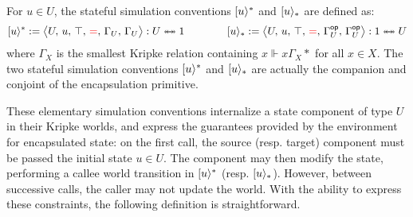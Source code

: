 

\begin{definition}
  For $u \in U$,
  the stateful simulation conventions
  $[ {u} \rangle^*$ and
  $[ {u} \rangle_*$ are defined as:
  \[
    [ {u} \rangle^* :=
    \big\langle U,\, u,\, \top ,\, \textcolor{red}{=},\, \Gamma_U,\, \Gamma_U \big\rangle
    : U \twoheadleftarrow \mathrel{\mkern-15mu} \twoheadrightarrow 1
    \qquad \qquad
    [ {u} \rangle_* :=
    \big\langle U,\, u,\, \top,\, \textcolor{red}{=},\, \Gamma_U^{ \mathsf{op} },\, \Gamma_U^{ \mathsf{op} } \big\rangle
    : 1 \twoheadleftarrow \mathrel{\mkern-15mu} \twoheadrightarrow U
  \]
  where $\Gamma_X$
  is the smallest Kripke relation containing $x \Vdash x \mathrel{\Gamma_X} *$ for all $x \in X$.
  The two stateful simulation conventions
  $[ {u} \rangle^*$ and $[ {u} \rangle_*$
  are actually the companion and conjoint of the encapsulation primitive.
\end{definition}


These elementary simulation conventions
internalize a state component of type $U$ in their Kripke worlds,
and express the guarantees provided by the environment
for encapsulated state:
on the first call, the source (resp. target) component
must be passed the initial state $u \in U$.
The component may then modify the state,
performing a callee world transition
in $[ {u} \rangle^*$ (resp. $[ {u} \rangle_*$).
However,
between successive calls,
the caller may not update the world.
With the ability to express these constraints,
the following definition is straightforward.

